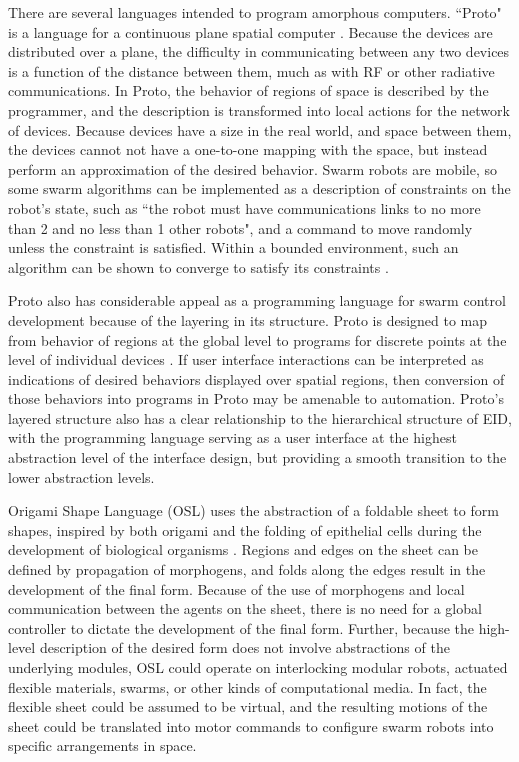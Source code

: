 \documentclass[]{article}
\begin{document}
There are several languages intended to program amorphous computers. 
``Proto" is a language for a continuous plane spatial computer \cite{correll2009ad}.
Because the devices are distributed over a plane, the difficulty in communicating between any two devices is a function of the distance between them, much as with RF or other radiative communications.
In Proto, the behavior of regions of space is described by the programmer, and the description is transformed into local actions for the network of devices. 
Because devices have a size in the real world, and space between them, the devices cannot not have a one-to-one mapping with the space, but instead perform an approximation of the desired behavior. 
Swarm robots are mobile, so some swarm algorithms can be implemented as a description of constraints on the robot's state, such as ``the robot must have communications links to no more than 2 and no less than 1 other robots", and a command to move randomly unless the constraint is satisfied. 
Within a bounded environment, such an algorithm can be shown to converge to satisfy its constraints \cite{correll2009ad}. 

Proto also has considerable appeal as a programming language for swarm control development because of the layering in its structure. 
Proto is designed to map from behavior of regions at the global level to programs for discrete points at the level of individual devices \cite{beal2006infrastructure}. 
If user interface interactions can be interpreted as indications of desired behaviors displayed over spatial regions, then conversion of those behaviors into programs in Proto may be amenable to automation. 
Proto's layered structure also has a clear relationship to the hierarchical structure of EID, with the programming language serving as a user interface at the highest abstraction level of the interface design, but providing a smooth transition to the lower abstraction levels.  

Origami Shape Language (OSL) uses the abstraction of a foldable sheet to form shapes, inspired by both origami and the folding of epithelial cells during the development of biological organisms \cite{nagpal2004engineering, nagpal2001programmable}.
Regions and edges on the sheet can be defined by propagation of morphogens, and folds along the edges result in the development of the final form.
Because of the use of morphogens and local communication between the agents on the sheet, there is no need for a global controller to dictate the development of the final form. 
Further, because the high-level description of the desired form does not involve abstractions of the underlying modules, OSL could operate on interlocking modular robots, actuated flexible materials, swarms, or other kinds of computational media. 
In fact, the flexible sheet could be assumed to be virtual, and the resulting motions of the sheet could be translated into motor commands to configure swarm robots into specific arrangements in space. 
\end{document}
